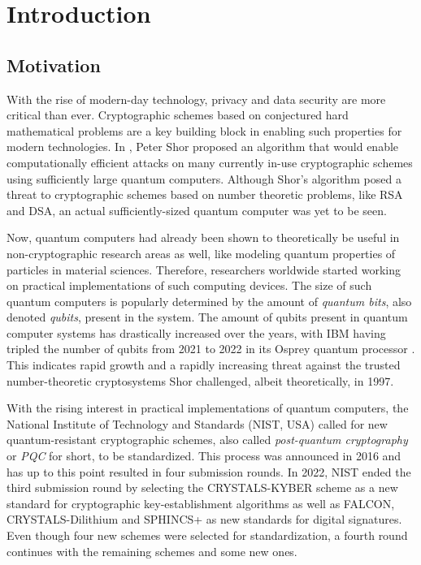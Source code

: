 \section{Introduction} \label{sec:intro}
\subsection{Motivation}
With the rise of modern-day technology, privacy and data security are more critical than ever. Cryptographic schemes based on conjectured hard mathematical problems are a key building block in enabling such properties for modern technologies. In \cite{Shor_1997}, Peter Shor proposed an algorithm that would enable computationally efficient attacks on many currently in-use cryptographic schemes using sufficiently large quantum computers. Although Shor's algorithm posed a threat to cryptographic schemes based on number theoretic problems, like RSA and DSA, an actual sufficiently-sized quantum computer was yet to be seen. 

Now, quantum computers had already been shown to theoretically be useful in non-cryptographic research areas as well, like modeling quantum properties of particles in material sciences. Therefore, researchers worldwide started working on practical implementations of such computing devices. The size of such quantum computers is popularly determined by the amount of \textit{quantum bits}, also denoted \textit{qubits}, present in the system. The amount of qubits present in quantum computer systems has drastically increased over the years, with IBM having tripled the number of qubits from 2021 to 2022 in its Osprey quantum processor \cite{IBM_Osprey}. This indicates rapid growth and a rapidly increasing threat against the trusted number-theoretic cryptosystems Shor challenged, albeit theoretically, in 1997.

With the rising interest in practical implementations of quantum computers, the National Institute of Technology and Standards (NIST, USA) called for new quantum-resistant cryptographic schemes, also called \textit{post-quantum cryptography} or \textit{PQC} for short, to be standardized. This process was announced in 2016 and has up to this point resulted in four submission rounds. In 2022, NIST ended the third submission round by selecting the CRYSTALS-KYBER scheme as a new standard for cryptographic key-establishment algorithms as well as FALCON, CRYSTALS-Dilithium and SPHINCS+ as new standards for digital signatures. Even though four new schemes were selected for standardization, a fourth round continues with the remaining schemes and some new ones. 

